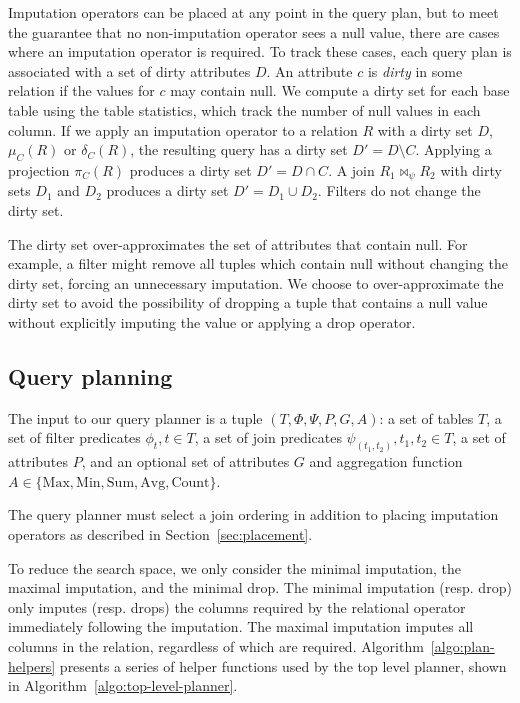 Imputation operators can be placed at any point in the query plan, but to meet the guarantee that no non-imputation operator sees a null value, there are cases where an imputation operator is required. To track these cases, each query plan is associated with a set of dirty attributes $D$. An attribute $c$ is \emph{dirty} in some relation if the values for $c$ may contain null. We compute a dirty set for each base table using the table statistics, which track the number of null values in each column. If we apply an imputation operator to a relation $R$ with a dirty set $D$, $\mu_C (R)$ or $\delta_C (R)$, the resulting query has a dirty set $D' = D \setminus C$.  Applying a projection $\pi_C(R)$ produces a dirty set $D' = D \cap C$. A join $R_1 \Join_\psi R_2$ with dirty sets $D_1$ and $D_2$  produces a dirty set $D' = D_1 \cup D_2$.  Filters do not change the dirty set.

The dirty set over-approximates the set of attributes that contain null. For example, a filter might remove all tuples which contain null without changing the dirty set, forcing an unnecessary imputation. We choose to over-approximate the dirty set to avoid the possibility of dropping a tuple that contains a null value without explicitly imputing the value or applying a drop operator.

\subsection{Query planning}
The input to our query planner is a tuple $(T, \Phi, \Psi, P, G, A)$: a set of tables $T$, a set of filter predicates $\phi_t, t \in T$, a set of join predicates $\psi_(t_1, t_2), t_1, t_2 \in T$, a set of attributes $P$, and an optional set of attributes $G$ and aggregation function $A \in \{\text{Max}, \text{Min}, \text{Sum}, \text{Avg}, \text{Count}\}$.

The query planner must select a join ordering in addition to placing imputation operators as described in Section~\ref{sec:placement}.

To reduce the search space, we only consider the minimal imputation, the maximal imputation, and the minimal drop. The minimal imputation (resp. drop) only imputes (resp. drops) the columns required by the relational operator immediately following the imputation. The maximal imputation imputes all columns in the relation, regardless of which are required.  Algorithm~\ref{algo:plan-helpers} presents
a series of helper functions used by the top level planner, shown in Algorithm~\ref{algo:top-level-planner}.


